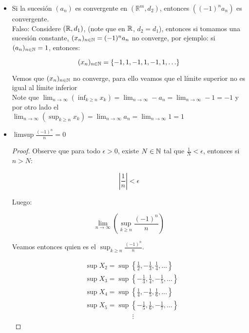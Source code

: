 \begin{itemize}[leftmargin=*]
\begin{proof}
    $$|b_n-a|=|a_n-a|<\epsilon$$

    Luego $b_n$ es convergente y además converge a $a$
    \end{proof}

\begin{note}
Usamos el máximo ya si $m$ es el máximo entonces a partir del punto en que $a_n=b_n$ ya tenemos convergencia, si $N$ es el máximo entonces desde antes de tener convergencia ya teníamos que $a_n=b_n$, luego es conveniente escoger $n>\max\{N,m\}$, para que se de $n$ en adelante tengamos tanto convergencia como que las sucesiones son iguales.
\end{note}
    
    \item Si la sucesión $\left(a_n\right)$ es convergente en $\left(\mathbb{R}^m, d_2\right)$, entonces $\left((-1)^n a_n\right)$ es convergente.\\
    
    Falso: Considere $(\mathbb{R},d_1)$, (note que en $\mathbb{R}$, $d_2=d_1$), entonces si tomamos una sucesión constante, $(x_n)_{n\in\mathbb{N}}=(-1)^na_n$ no converge, por ejemplo: si $(a_n)_{n\in \mathbb{N}}=1$, entonces:

    $$(x_n)_{n\in \mathbb{N}}=\{-1,1,-1,1,-1,1,\ldots\}$$ 

    Vemos que $(x_n)_{n\in\mathbb{N}}$ no converge, para ello veamos que el límite superior no es igual al límite inferior\\

    Note que $\lim_{n \to \infty} \left( \inf_{k\geq n} x_k \right)=\lim_{n \to \infty} -a_n=\lim_{n \to \infty} -1=-1$ y por otro lado el \\
    $\lim_{n \to \infty} \left( \sup_{k\geq n} x_k\right)=\lim_{n \to \infty} a_n=\lim_{n \to \infty} 1=1$

    \item $\limsup \frac{(-1)^n}{n}=0$\\
    
    \begin{proof} 
    Observe que para todo $\epsilon>0$, existe $N\in \mathbb{N}$ tal que $\frac{1}{N}<\epsilon$, entonces si $n>N$:


    $$\left| \frac{1}{n} \right|<\epsilon$$

    Luego:

    $$\lim _{n \rightarrow \infty}\left(\sup _{k \geq n} \frac{(-1)^n}{n}\right)$$

    Veamos entonces quien es el $\sup_{k\geq n}\frac{(-1)^n}{n}$.

    \begin{align*}
        &\sup X_2=\sup \left\{\frac{1}{2},-\frac{1}{3},\frac{1}{4},\ldots\right\}\\
        &\sup X_3=\sup\left\{-\frac{1}{3},\frac{1}{4},-\frac{1}{5},\ldots\right\}\\
        &\sup X_4=\sup\left\{\frac{1}{4},-\frac{1}{5},\frac{1}{6},\ldots\right\}\\
        &\sup X_5=\sup\left\{-\frac{1}{5},\frac{1}{6},-\frac{1}{7},\ldots\right\}\\
        & \mathrel{\phantom{=askldfjaddsl}}\vdots
    \end{align*}


\end{proof}
\end{itemize}
